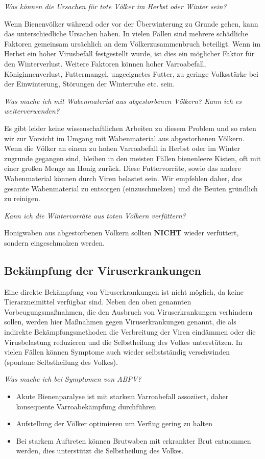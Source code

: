 \textit{Was können die Ursachen für tote Völker im Herbst oder Winter sein?}

Wenn Bienenvölker während oder vor der Überwinterung zu Grunde gehen, kann das unterschiedliche Ursachen haben. In vielen Fällen sind mehrere schädliche Faktoren gemeinsam ursächlich an dem Völkerzusammenbruch beteiligt. Wenn im Herbst ein hoher Virusbefall festgestellt wurde, ist dies ein möglicher Faktor für den Winterverlust. Weitere Faktoren können hoher Varroabefall, Königinnenverlust, Futtermangel, ungeeignetes Futter, zu geringe Volksstärke bei der Einwinterung, Störungen der Winterruhe etc. sein.

\textit{Was mache ich mit Wabenmaterial aus abgestorbenen Völkern? Kann ich es weiterverwenden?}

Es gibt leider keine wissenschaftlichen Arbeiten zu diesem Problem und so raten wir zur Vorsicht im Umgang mit Wabenmaterial aus abgestorbenen Völkern. Wenn die Völker an einem zu hohen Varroabefall in Herbst oder im Winter zugrunde gegangen sind, bleiben in den meisten Fällen bienenleere Kisten, oft mit einer großen Menge an Honig zurück. Diese Futtervorräte, sowie das andere Wabenmaterial können durch Viren belastet sein. Wir empfehlen daher, das gesamte Wabenmaterial zu entsorgen (einzuschmelzen) und die Beuten gründlich zu reinigen.

\textit{Kann ich die Wintervorräte aus toten Völkern verfüttern?}

Honigwaben aus abgestorbenen Völkern sollten \textbf{NICHT} wieder verfüttert, sondern eingeschmolzen werden.

\subsection{Bekämpfung der Viruserkrankungen}

Eine direkte Bekämpfung von Viruserkrankungen ist nicht möglich, da keine Tierarzneimittel verfügbar sind. Neben den oben genannten Vorbeugungsmaßnahmen, die den Ausbruch von Viruserkrankungen verhindern sollen, werden hier Maßnahmen gegen Viruserkrankungen genannt, die als indirekte Bekämpfungsmethoden die Verbreitung der Viren eindämmen oder die Virusbelastung reduzieren und die Selbstheilung des Volkes unterstützen. In vielen Fällen können Symptome auch wieder selbstständig verschwinden (spontane Selbstheilung des Volkes).

\textit{Was mache ich bei Symptomen von ABPV?}

\begin{itemize}
    \item Akute Bienenparalyse ist mit starkem Varroabefall assoziiert, daher konsequente Varroabekämpfung durchführen
    \item Aufstellung der Völker optimieren um Verflug gering zu halten
    \item Bei starkem Auftreten können Brutwaben mit erkrankter Brut entnommen werden, dies unterstützt die Selbstheilung des Volkes.
\end{itemize}

